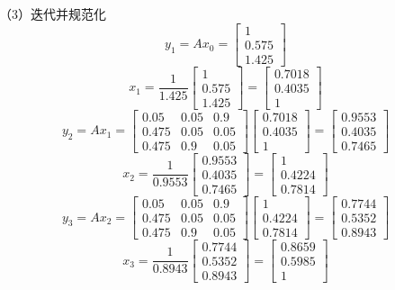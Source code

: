\documentclass[UTF8, 12pt, fontset=fandol, oneside]{ctexart}
\begin{document}
（3）迭代并规范化
\[
y_1=Ax_0=
\begin{bmatrix}
1\\
0.575\\
1.425
\end{bmatrix}
\]
\[
x_1=\frac{1}{1.425}
\begin{bmatrix}
1\\
0.575\\
1.425
\end{bmatrix}
=
\begin{bmatrix}
0.7018\\
0.4035\\
1
\end{bmatrix}
\]
\[
y_2=Ax_1=
\begin{bmatrix}
0.05 & 0.05 & 0.9\\
0.475 & 0.05 & 0.05\\
0.475 & 0.9 & 0.05
\end{bmatrix}
\begin{bmatrix}
0.7018\\
0.4035\\
1
\end{bmatrix}
=
\begin{bmatrix}
0.9553\\
0.4035\\
0.7465
\end{bmatrix}
\]
\[
x_2=\frac{1}{0.9553}
\begin{bmatrix}
0.9553\\
0.4035\\
0.7465
\end{bmatrix}
=
\begin{bmatrix}
1\\
0.4224\\
0.7814
\end{bmatrix}
\]
\[
y_3=Ax_2=
\begin{bmatrix}
0.05 & 0.05 & 0.9\\
0.475 & 0.05 & 0.05\\
0.475 & 0.9 & 0.05
\end{bmatrix}
\begin{bmatrix}
1\\
0.4224\\
0.7814
\end{bmatrix}
=
\begin{bmatrix}
0.7744\\
0.5352\\
0.8943
\end{bmatrix}
\]
\[
x_3=\frac{1}{0.8943}
\begin{bmatrix}
0.7744\\
0.5352\\
0.8943
\end{bmatrix}
=
\begin{bmatrix}
0.8659\\
0.5985\\
1
\end{bmatrix}
\]
\end{document}
